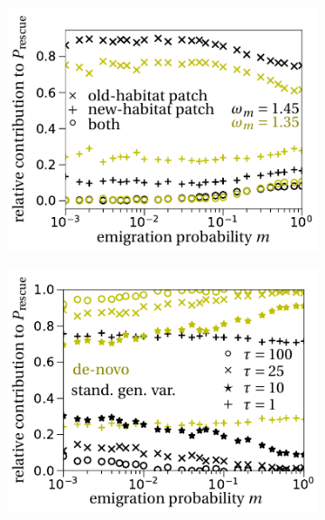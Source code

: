 \documentclass[a4paper,11pt]{article}
\begin{document}
\begin{figure}[t]
	\centering
		\begin{subfigure}{.5\textwidth}
 		 \centering
 		 \includegraphics[width=\linewidth]{fig6a.pdf}
  		\caption{}
	\end{subfigure}%
    \begin{subfigure}{.5\textwidth}
 		 \centering
 		 \includegraphics[width=\linewidth]{fig6b.pdf}
  		\caption{}
	\end{subfigure}

\end{figure}
\end{document}
